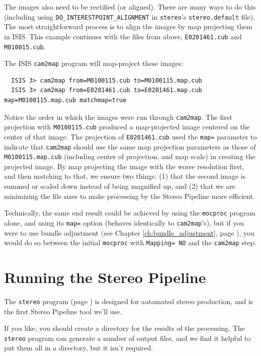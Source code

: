 The images also need to be rectified (or aligned).  There are many
ways to do this (including using \texttt{DO\_INTERESTPOINT\_ALIGNMENT}
in \texttt{stereo}'s \texttt{stereo.default} file).  The most
straightforward process is to align the images by map projecting
them in \ac{ISIS}. This example continues with the files from above,
\texttt{E0201461.cub} and \texttt{M010015.cub}.

The \ac{ISIS} \texttt{cam2map} program will map-project these images:

\begin{verbatim}
  ISIS 3> cam2map from=M0100115.cub to=M0100115.map.cub
  ISIS 3> cam2map from=E0201461.cub to=E0201461.map.cub map=M0100115.map.cub matchmap=true
\end{verbatim}

Notice the order in which the images were run through \texttt{cam2map}.
The first projection with \texttt{M0100115.cub} produced a map-projected
image centered on the center of that image.  The projection of
\texttt{E0201461.cub} used the \texttt{map=} parameter to indicate
that \texttt{cam2map} should use the same map projection parameters
as those of \texttt{M0100115.map.cub} (including center of projection,
and map scale) in creating the projected image.  By map projecting the
image with the worse resolution first, and then matching to that, we
ensure two things: (1) that the second image is summed or scaled down
instead of being magnified up, and (2) that we are minimizing the file
sizes to make processing by the Stereo Pipeline more efficient.

Technically, the same end result could be achieved by using the
\texttt{mocproc} program alone, and using its \texttt{map=} option
(behaves identically to \texttt{cam2map}'s), but if you were to use
bundle adjustment (see Chapter \ref{ch:bundle_adjustment}, page
\pageref{ch:bundle_adjustment}), you would do so between the initial
\texttt{mocproc} with \texttt{Mapping= NO} and the \texttt{cam2map}
step.

\section{Running the Stereo Pipeline}

The \texttt{stereo} program (page \pageref{stereo}) is designed for
automated stereo production, and is the first Stereo Pipeline tool
we'll use.

If you like, you should create a directory for the results of the
processing.  The \texttt{stereo} program can generate a number of
output files, and we find it helpful to put them all in a directory,
but it isn't required.

